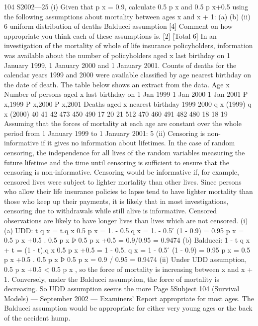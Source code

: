 \documentclass[a4paper,12pt]{article}
\begin{document}
\begin{enumerate}
[Total 7]
104 S2002—25
(i)
Given that p x = 0.9, calculate 0.5 p x and 0.5 p x+0.5 using the following
assumptions about mortality between ages x and x + 1:
(a)
(b)
(ii)
6
uniform distribution of deaths
Balducci assumption
[4]
Comment on how appropriate you think each of these assumptions is.
[2]
[Total 6]
In an investigation of the mortality of whole of life insurance policyholders,
information was available about the number of policyholders aged x last birthday on
1 January 1999, 1 January 2000 and 1 January 2001. Counts of deaths for the
calendar years 1999 and 2000 were available classified by age nearest birthday on the
date of death. The table below shows an extract from the data.
Age
x Number of persons aged x last birthday on
1 Jan 1999
1 Jan 2000
1 Jan 2001
P x,1999
P x,2000
P x,2001 Deaths aged x nearest birthday
1999
2000
q x (1999) q x (2000)
40
41
42 473
450
490 17
20
21
512
470
460
491
482
480
18
18
19
Assuming that the forces of mortality at each age are constant over the whole period
from 1 January 1999 to 1 January 2001:
5
(ii) Censoring is non-informative if it gives no information about lifetimes. In the
case of random censoring, the independence for all lives of the random
variables measuring the future lifetime and the time until censoring is
sufficient to ensure that the censoring is non-informative. Censoring would be
informative if, for example, censored lives were subject to lighter mortality
than other lives. Since persons who allow their life insurance policies to lapse
tend to have lighter mortality than those who keep up their payments, it is
likely that in most investigations, censoring due to withdrawals while still
alive is informative. Censored observations are likely to have longer lives
than lives which are not censored.
(i) (a)
UDD: t q x = t.q x
0.5 p x
= 1. - 0.5.q x = 1. - 0.5  ́ (1 - 0.9) = 0.95
p x = 0.5 p x +0.5 . 0.5 p x
Þ 0.5 p x +0.5 = 0.9/0.95 = 0.9474
(b)
Balducci: 1 - t q x + t = (1 - t).q x
0.5 p x +0.5
= 1 - 0.5. q x = 1 - 0.5  ́ (1 - 0.9) = 0.95
p x = 0.5 p x +0.5 . 0.5 p x
Þ 0.5 p x = 0.9 / 0.95 = 0.9474
(ii)
Under UDD assumption, 0.5 p x +0.5 < 0.5 p x , so the force of mortality is
increasing between x and x + 1. Conversely, under the Balducci assumption,
the force of mortality is decreasing. So UDD assumption seems the more
Page 5Subject 104 (Survival Models) — September 2002 — Examiners’ Report
appropriate for most ages. The Balducci assumption would be appropriate for
either very young ages or the back of the accident hump.

\end{enumerate}
\end{document}
